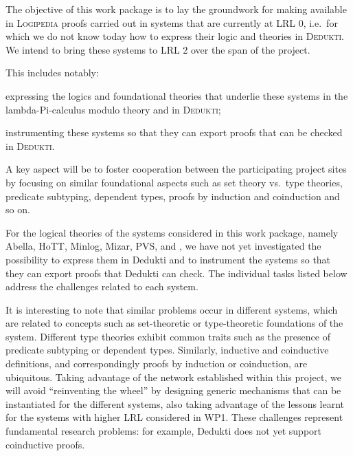 \begin{workpackage}[id=theories,wphases=0-48,type=RTD,
  short=Theories in Dedukti,%
  title= Defining theories in Dedukti,
  lead=Inn,
  InnRM=10]



\begin{wpobjectives}
  The objective of this work package is to lay the groundwork for making
  available in \textsc{Logipedia} proofs carried out in systems that are
  currently at LRL $0$, i.e.\ for which we do not know today how to express
  their logic and theories in \textsc{Dedukti}. We intend to bring these systems
  to LRL $2$ over the span of the project.

This includes notably:
  \begin{compactitem}
  \item expressing the logics and foundational theories that underlie these
    systems in the lambda-Pi-calculus modulo theory and in \textsc{Dedukti};
  \item instrumenting these systems so that they can export proofs that can be
    checked in \textsc{Dedukti}.
  \end{compactitem}
  A key aspect will be to foster cooperation between the participating project
  sites by focusing on similar foundational aspects such as set theory vs.\ type
  theories, predicate subtyping, dependent types, proofs by induction and
  coinduction and so on.
\end{wpobjectives}

\begin{wpdescription}
  For the logical theories of the systems considered in this work package,
  namely Abella, HoTT, Minlog, Mizar, PVS, and \tlaplus, we have not yet
  investigated the possibility to express them in Dedukti and to instrument the
  systems so that they can export proofs that Dedukti can check. The individual
  tasks listed below address the challenges related to each system.

  It is interesting to note that similar problems occur in different systems,
  which are related to concepts such as set-theoretic or type-theoretic
  foundations of the system. Different type theories exhibit common traits such
  as the presence of predicate subtyping or dependent types. Similarly,
  inductive and coinductive definitions, and correspondingly proofs by induction
  or coinduction, are ubiquitous. Taking advantage of the network established
  within this project, we will avoid ``reinventing the wheel'' by designing
  generic mechanisms that can be instantiated for the different systems, also
  taking advantage of the lessons learnt for the systems with higher LRL
  considered in WP1. These challenges represent fundamental research problems:
  for example, Dedukti does not yet support coinductive proofs.
\end{wpdescription}


\end{workpackage}
